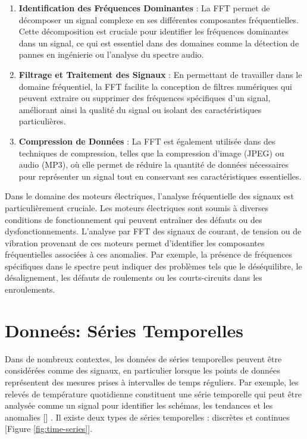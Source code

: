 \begin{enumerate}
	\item \textbf{Identification des Fréquences Dominantes} : La FFT permet de décomposer un signal complexe en ses différentes composantes fréquentielles. Cette décomposition est cruciale pour identifier les fréquences dominantes dans un signal, ce qui est essentiel dans des domaines comme la détection de pannes en ingénierie ou l'analyse du spectre audio.

	\item \textbf{Filtrage et Traitement des Signaux} : En permettant de travailler dans le domaine fréquentiel, la FFT facilite la conception de filtres numériques qui peuvent extraire ou supprimer des fréquences spécifiques d'un signal, améliorant ainsi la qualité du signal ou isolant des caractéristiques particulières.

	\item \textbf{Compression de Données} : La FFT est également utilisée dans des techniques de compression, telles que la compression d'image (JPEG) ou audio (MP3), où elle permet de réduire la quantité de données nécessaires pour représenter un signal tout en conservant ses caractéristiques essentielles.
\end{enumerate}

Dans le domaine des moteurs électriques, l'analyse fréquentielle des signaux
est particulièrement cruciale. Les moteurs électriques sont soumis à diverses
conditions de fonctionnement qui peuvent entraîner des défauts ou des
dysfonctionnements. L'analyse par FFT des signaux de courant, de tension ou de
vibration provenant de ces moteurs permet d'identifier les composantes
fréquentielles associées à ces anomalies. Par exemple, la présence de
fréquences spécifiques dans le spectre peut indiquer des problèmes tels que le
déséquilibre, le désalignement, les défauts de roulements ou les
courts-circuits dans les enroulements.

\section{Donneés: Séries Temporelles}

Dans de nombreux contextes, les données de séries temporelles peuvent être
considérées comme des signaux, en particulier lorsque les points de données
représentent des mesures prises à intervalles de temps réguliers. Par exemple,
les relevés de température quotidienne constituent une série temporelle qui
peut être analysée comme un signal pour identifier les schémas, les tendances
et les anomalies [\cite{brophy2023gan}] . Il existe deux types de séries
temporelles : discrètes et continues [Figure \ref{fig:time-series}].

